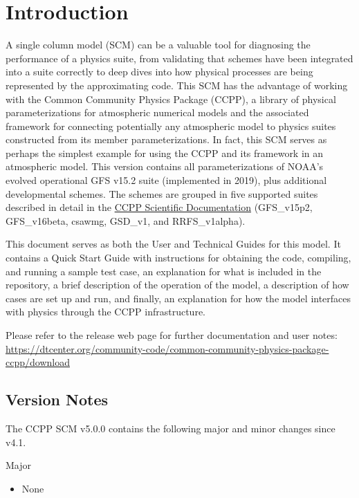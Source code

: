 \chapter{Introduction}
\label{chapter: introduction}

A single column model (SCM) can be a valuable tool for diagnosing the performance of a physics suite, from validating that schemes have been integrated into a suite correctly to deep dives into how physical processes are being represented by the approximating code. This SCM has the advantage of working with the Common Community Physics Package (CCPP), a library of physical parameterizations for atmospheric numerical models and the associated framework for connecting potentially any atmospheric model to physics suites constructed from its member parameterizations. In fact, this SCM serves as perhaps the simplest example for using the CCPP and its framework in an atmospheric model. This version contains all parameterizations of NOAA's evolved operational GFS v15.2 suite (implemented in 2019), plus additional developmental schemes. The schemes are grouped in five supported suites described in detail in the \href{https://dtcenter.ucar.edu/GMTB/v5.0.0/sci_doc/}{CCPP Scientific Documentation} (GFS\_v15p2, GFS\_v16beta, csawmg, GSD\_v1, and RRFS\_v1alpha).

This document serves as both the User and Technical Guides for this model. It contains a Quick Start Guide with instructions for obtaining the code, compiling, and running a sample test case, an explanation for what is included in the repository, a brief description of the operation of the model, a description of how cases are set up and run, and finally, an explanation for how the model interfaces with physics through the CCPP infrastructure.

Please refer to the release web page for further documentation and user notes:\\ \url{https://dtcenter.org/community-code/common-community-physics-package-ccpp/download}

\section{Version Notes}

The CCPP SCM v5.0.0 contains the following major and minor changes since v4.1.

Major
\begin{itemize}
\item None
\end{itemize}

